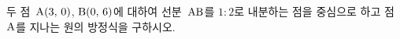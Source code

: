 두 점~$\mathrm{A}(3,\mkern3mu 0)$, $\mathrm{B}(0,\mkern3mu 6)$에 대하여 선분~$\mathrm{AB}$를 $1:2$로 내분하는 점을 중심으로 하고 점~$\mathrm{A}$를 지나는 원의 방정식을 구하시오.
